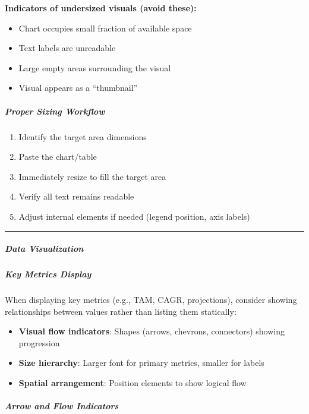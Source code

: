 \documentclass[11pt]{article}
\begin{document}
\textbf{Indicators of undersized visuals (avoid these):}

\begin{itemize}[leftmargin=*,itemsep=2pt,topsep=2pt]
\item {} Chart occupies small fraction of available space
\item {} Text labels are unreadable
\item {} Large empty areas surrounding the visual
\item {} Visual appears as a ``thumbnail''
\end{itemize}

\subparagraph{Proper Sizing Workflow}\mbox{}\par

\begin{enumerate}[leftmargin=*,itemsep=2pt,topsep=2pt]
\item {} Identify the target area dimensions
\item {} Paste the chart/table
\item {} Immediately resize to fill the target area
\item {} Verify all text remains readable
\item {} Adjust internal elements if needed (legend position, axis labels)
\end{enumerate}

\vspace{0.5em}\hrule\vspace{0.5em}

\subparagraph{Data Visualization}\mbox{}\par

\subparagraph{Key Metrics Display}\mbox{}\par

When displaying key metrics (e.g., TAM, CAGR, projections), consider showing relationships between values rather than listing them statically:


\begin{itemize}[leftmargin=*,itemsep=2pt,topsep=2pt]
\item {} \textbf{Visual flow indicators}: Shapes (arrows, chevrons, connectors) showing progression
\item {} \textbf{Size hierarchy}: Larger font for primary metrics, smaller for labels
\item {} \textbf{Spatial arrangement}: Position elements to show logical flow
\end{itemize}

\subparagraph{Arrow and Flow Indicators}\mbox{}\par
\end{document}
